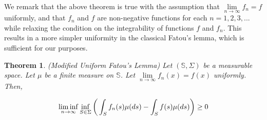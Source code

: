 \documentclass{amsart}
\newtheorem{theorem}{Theorem}
\theoremstyle{named}
\begin{document}
We remark that the above theorem is true with the assumption that $\lim\limits_{n \rightarrow \infty} f_n = f$ uniformly, and that $f_n$ and $f$ are non-negative functions for each $n=1,2,3,...$ while relaxing the condition on the integrability of functions $f$ and $f_n$. This results in a more simpler uniformity in the classical Fatou's lemma, which is sufficient for our purposes. 

\begin{theorem} \label{theorem: modified_fatou} (Modified Uniform Fatou's Lemma) 
    Let $(\mathbb{S}, \Sigma)$ be a measurable space. Let $\mu$ be a finite measure on $\mathbb{S}$. Let $\lim\limits_{n \rightarrow \infty}f_n(x) = f(x)$ uniformly. Then,

    \begin{equation} \label{eqn: uniform_fatou}
        \liminf\limits_{n \rightarrow \infty}\inf\limits_{S \in \Sigma} \bigg( \int_S f_n(s) \mu(ds) - \int_S f(s) \mu(ds) \bigg) \geq 0 \\
    \end{equation}
\end{theorem}
\end{document}
